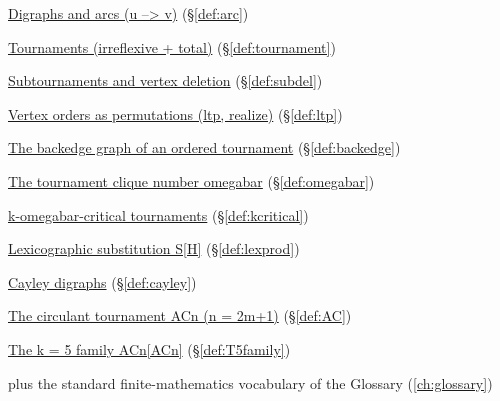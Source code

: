 \begin{closurepanel}
\item \hyperref[def:arc]{Digraphs and arcs (u --> v)} (\S\ref*{def:arc})
\item \hyperref[def:tournament]{Tournaments (irreflexive + total)} (\S\ref*{def:tournament})
\item \hyperref[def:subdel]{Subtournaments and vertex deletion} (\S\ref*{def:subdel})
\item \hyperref[def:ltp]{Vertex orders as permutations (ltp, realize)} (\S\ref*{def:ltp})
\item \hyperref[def:backedge]{The backedge graph of an ordered tournament} (\S\ref*{def:backedge})
\item \hyperref[def:omegabar]{The tournament clique number omegabar} (\S\ref*{def:omegabar})
\item \hyperref[def:kcritical]{k-omegabar-critical tournaments} (\S\ref*{def:kcritical})
\item \hyperref[def:lexprod]{Lexicographic substitution S[H]} (\S\ref*{def:lexprod})
\item \hyperref[def:cayley]{Cayley digraphs} (\S\ref*{def:cayley})
\item \hyperref[def:AC]{The circulant tournament ACn (n = 2m+1)} (\S\ref*{def:AC})
\item \hyperref[def:T5family]{The k = 5 family ACn[ACn]} (\S\ref*{def:T5family})
\item plus the standard finite-mathematics vocabulary of the Glossary (\cref{ch:glossary})
\end{closurepanel}
